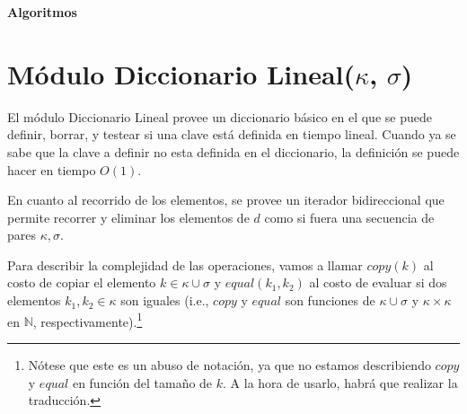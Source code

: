 \documentclass[a4paper,10pt]{article}
\newenvironment{Algoritmos}{%
  \vspace*{2ex}%
  \noindent\textbf{\Large Algoritmos}%
  \vspace*{2ex}%
}{}
\begin{document}
\begin{Algoritmos}
  
\end{Algoritmos}

\section{Módulo Diccionario Lineal($\kappa$, $\sigma$)}

El módulo Diccionario Lineal provee un diccionario básico en el que se puede definir, borrar, y testear si una clave está definida en tiempo lineal.  Cuando ya se sabe que la clave a definir no esta definida en el diccionario, la definición se puede hacer en tiempo $O(1)$.

En cuanto al recorrido de los elementos, se provee un iterador bidireccional que permite recorrer y eliminar los elementos de $d$ como si fuera una secuencia de pares $\kappa,\sigma$.

Para describir la complejidad de las operaciones, vamos a llamar $copy(k)$ al costo de copiar el elemento $k \in \kappa \cup \sigma$ y $equal(k_1, k_2)$ al costo de evaluar si dos elementos $k_1, k_2 \in \kappa$ son iguales (i.e., $copy$ y $equal$ son funciones de $\kappa \cup \sigma$ y $\kappa \times \kappa$ en $\mathbb{N}$, respectivamente).\footnote{Nótese que este es un abuso de notación, ya que no estamos describiendo $copy$ y $equal$ en función del tamaño de $k$.  A la hora de usarlo, habrá que realizar la traducción.}
\end{document}
